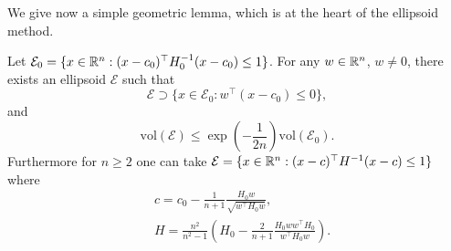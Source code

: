 We give now a simple geometric lemma, which is at the heart of the ellipsoid method.
\begin{lemma} \label{lem:geomellipsoid}
Let $\mathcal{E}_0 = \{x \in \mathbb{R}^n : (x - c_0)^{\top} H_0^{-1} (x-c_0) \leq 1 \}$. For any $w \in \mathbb{R}^n$, $w \neq 0$, there exists an ellipsoid $\mathcal{E}$ such that
\begin{equation}
\mathcal{E} \supset \{x \in \mathcal{E}_0 : w^{\top} (x-c_0) \leq 0\} , \label{eq:ellipsoidlemma1}
\end{equation}
and 
\begin{equation}
\mathrm{vol}(\mathcal{E}) \leq \exp \left(- \frac{1}{2 n} \right) \mathrm{vol}(\mathcal{E}_0) . \label{eq:ellipsoidlemma2}
\end{equation}
Furthermore for $n \geq 2$ one can take $\mathcal{E} = \{x \in \mathbb{R}^n : (x - c)^{\top} H^{-1} (x-c) \leq 1 \}$ where
\begin{align}
& c = c_0 - \frac{1}{n+1} \frac{H_0 w}{\sqrt{w^{\top} H_0 w}} , \label{eq:ellipsoidlemma3}\\
& H = \frac{n^2}{n^2-1} \left(H_0 - \frac{2}{n+1} \frac{H_0 w w^{\top} H_0}{w^{\top} H_0 w} \right) . \label{eq:ellipsoidlemma4}
\end{align}
\end{lemma}

